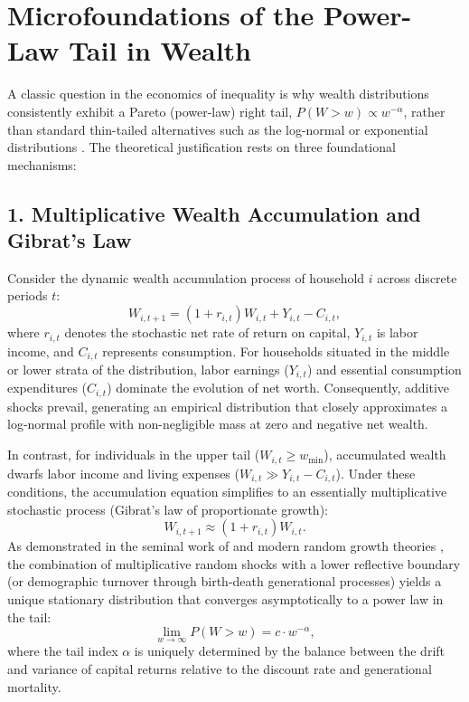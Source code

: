 \newpage

\section{Microfoundations of the Power-Law Tail in Wealth}\label{app:pareto-foundations}

A classic question in the economics of inequality is why wealth distributions consistently exhibit a Pareto (power-law) right tail, $P(W > w) \propto w^{-\alpha}$, rather than standard thin-tailed alternatives such as the log-normal or exponential distributions \citep{gabaix2009power,benhabib2018skewed}. The theoretical justification rests on three foundational mechanisms:

\subsection*{1. Multiplicative Wealth Accumulation and Gibrat's Law}
Consider the dynamic wealth accumulation process of household $i$ across discrete periods $t$:
\begin{equation}
    W_{i, t+1} = (1 + r_{i, t}) W_{i, t} + Y_{i, t} - C_{i, t},
    \label{eq:wealth_accumulation}
\end{equation}
where $r_{i, t}$ denotes the stochastic net rate of return on capital, $Y_{i, t}$ is labor income, and $C_{i, t}$ represents consumption. For households situated in the middle or lower strata of the distribution, labor earnings ($Y_{i, t}$) and essential consumption expenditures ($C_{i, t}$) dominate the evolution of net worth. Consequently, additive shocks prevail, generating an empirical distribution that closely approximates a log-normal profile with non-negligible mass at zero and negative net wealth.

In contrast, for individuals in the upper tail ($W_{i, t} \ge w_{\min}$), accumulated wealth dwarfs labor income and living expenses ($W_{i, t} \gg Y_{i, t} - C_{i, t}$). Under these conditions, the accumulation equation simplifies to an essentially multiplicative stochastic process (Gibrat's law of proportionate growth):
\begin{equation}
    W_{i, t+1} \approx (1 + r_{i, t}) W_{i, t}.
\end{equation}
As demonstrated in the seminal work of \citet{champernowne1953model} and modern random growth theories \citep{gabaix2009power}, the combination of multiplicative random shocks with a lower reflective boundary (or demographic turnover through birth-death generational processes) yields a unique stationary distribution that converges asymptotically to a power law in the tail:
\begin{equation}
    \lim_{w \to \infty} P(W > w) = c \cdot w^{-\alpha},
\end{equation}
where the tail index $\alpha$ is uniquely determined by the balance between the drift and variance of capital returns relative to the discount rate and generational mortality.

